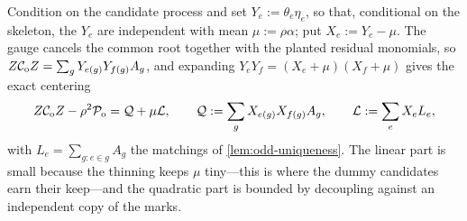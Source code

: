 \documentclass[11pt]{article}
\theoremstyle{definition}
\theoremstyle{remark}
\newcommand{\1}{\mathbf 1}
\newcommand{\cC}{\mathcal C}
\newcommand{\cL}{\mathcal L}
\newcommand{\cP}{\mathcal P}
\newcommand{\cQ}{\mathcal Q}
\numberwithin{equation}{section}
\begin{document}
Condition on the candidate process and set $Y_e:=\theta_e\eta_e$, so
that, conditional on the skeleton, the $Y_e$ are independent with mean
$\mu:=\rho\alpha$; put $X_e:=Y_e-\mu$.  The gauge cancels the common
root together with the planted residual monomials, so
$Z\cC_{\rm o}Z=\sum_{g}Y_{e(g)}Y_{f(g)}A_g$, and expanding
$Y_eY_f=(X_e+\mu)(X_f+\mu)$ gives the exact centering
\begin{equation}\label{eq:odd-centering}
 Z\cC_{\rm o}Z-\rho^2\cP_{\rm o}
 =\cQ+\mu\cL,
 \qquad
 \cQ:=\sum_gX_{e(g)}X_{f(g)}A_g,
 \qquad
 \cL:=\sum_eX_eL_e,
\end{equation}
with $L_e=\sum_{g:e\in g}A_g$ the matchings of
\cref{lem:odd-uniqueness}.  The linear part is small because the
thinning keeps $\mu$ tiny---this is where the dummy candidates earn
their keep---and the quadratic part is bounded by decoupling against an
independent copy of the marks.
\end{document}
